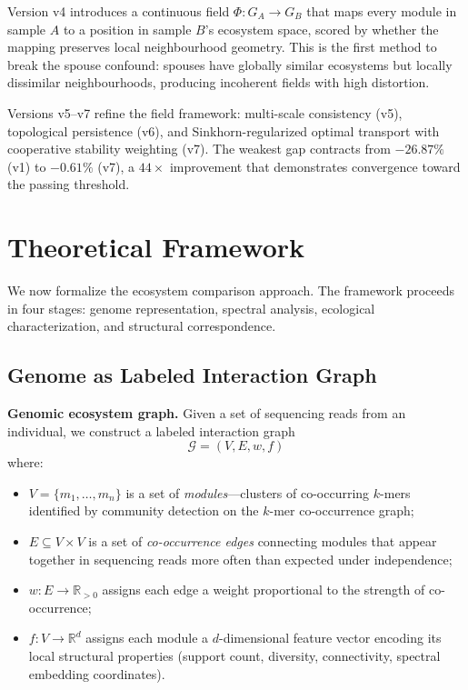 \documentclass{../yalumba}
\begin{document}
Version v4 introduces a continuous field $\Phi: G_A \to G_B$ that
maps every module in sample $A$ to a position in sample $B$'s ecosystem
space, scored by whether the mapping preserves local neighbourhood
geometry.  This is the first method to break the spouse confound:
spouses have globally similar ecosystems but locally dissimilar
neighbourhoods, producing incoherent fields with high distortion.

Versions v5--v7 refine the field framework: multi-scale consistency (v5),
topological persistence (v6), and Sinkhorn-regularized optimal transport
with cooperative stability weighting (v7).  The weakest gap contracts
from $-26.87\%$ (v1) to $-0.61\%$ (v7), a $44\times$ improvement that
demonstrates convergence toward the passing threshold.


\section{Theoretical Framework}
\label{sec:framework}

We now formalize the ecosystem comparison approach.  The framework
proceeds in four stages: genome representation, spectral analysis,
ecological characterization, and structural correspondence.

\subsection{Genome as Labeled Interaction Graph}
\label{sec:framework:graph}

\begin{definition}
\textbf{Genomic ecosystem graph.}  Given a set of sequencing reads from
an individual, we construct a labeled interaction graph
\[
  \mathcal{G} = (V, E, w, f)
\]
where:
\begin{itemize}
  \item $V = \{m_1, \ldots, m_n\}$ is a set of \emph{modules}---clusters
    of co-occurring $k$-mers identified by community detection on the
    $k$-mer co-occurrence graph;
  \item $E \subseteq V \times V$ is a set of \emph{co-occurrence edges}
    connecting modules that appear together in sequencing reads more
    often than expected under independence;
  \item $w: E \to \mathbb{R}_{>0}$ assigns each edge a weight
    proportional to the strength of co-occurrence;
  \item $f: V \to \mathbb{R}^d$ assigns each module a $d$-dimensional
    feature vector encoding its local structural properties (support
    count, diversity, connectivity, spectral embedding coordinates).
\end{itemize}
\end{definition}
\end{document}
